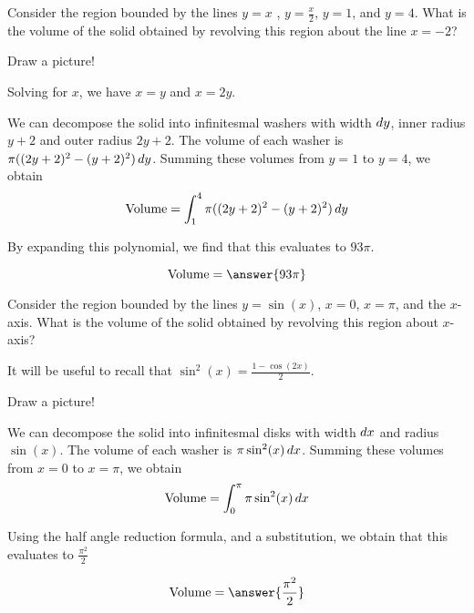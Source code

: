 \documentclass[handout]{ximera}
\begin{document}
\begin{exercise}
Consider the region bounded by the lines $y = x$ , $y=\frac{x}{2}$,
$y=1$, and $y = 4$.  What is the volume of the solid obtained by
revolving this region about the line $x=-2$?

\begin{hint}
	Draw a picture!
\end{hint}

\begin{hint}
	Solving for $x$, we have $x=y$ and $x = 2y$.
\end{hint}

\begin{hint}
  We can decompose the solid into infinitesmal washers with width $\mathop{}\!d
  y$, inner radius $y+2$ and outer radius $2y+2$. The volume of each
  washer is $\pi((2y+2)^2-(y+2)^2)\mathop{}\!d y$.  Summing these volumes from
  $y=1$ to $y=4$, we obtain
  \[
  \textrm{Volume} = \int_1^4 \pi((2y+2)^2-(y+2)^2)\mathop{}\!d y
  \]
\end{hint}


\begin{hint}
  By expanding this polynomial, we find that this evaluates to
  $93\pi$.
\end{hint}

  \[
  \textrm{Volume} = \answer{93\pi}
  \]


\end{exercise}


\begin{exercise}
Consider the region bounded by the lines $y = \sin(x)$, $x=0$,
$x=\pi$, and the $x$-axis.  What is the volume of the solid obtained
by revolving this region about $x$-axis?

It will be useful to recall that $\sin^2(x) = \frac{1-\cos(2x)}{2}$.

\begin{hint}
  Draw a picture!
\end{hint}

\begin{hint}
  We can decompose the solid into infinitesmal disks with width
  $\mathop{}\!d x$ and radius $\sin(x)$. The volume of each washer is $\pi
  \sin^2(x)\mathop{}\!d x$.  Summing these volumes from $x=0$ to $x=\pi$,
  we obtain
  \[
  \textrm{Volume} = \int_0^\pi \pi \sin^2(x)\mathop{}\!d x
  \]
\end{hint}

\begin{hint}
  Using the half angle reduction formula, and a substitution, we obtain that this evaluates to $\frac{\pi^2}{2}$
\end{hint}

  \[
  \textrm{Volume} = \answer{\frac{\pi^2}{2}}
  \]


\end{exercise}
\end{document}
